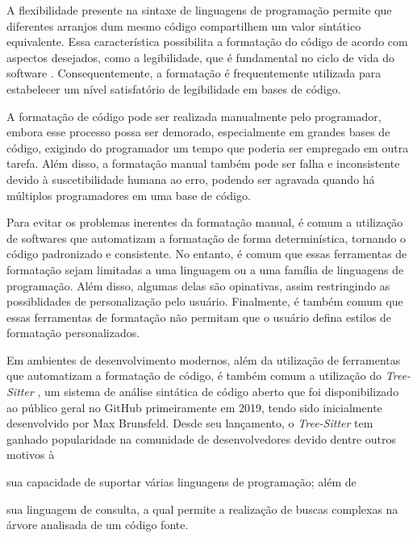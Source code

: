 \documentclass
  [11pt, a4paper, english, openright, sumario = tradicional, twoside, brazil]
  {abntex2}
\begin{document}
  A flexibilidade presente na sintaxe de linguagens de programação permite que
  diferentes arranjos dum mesmo código compartilhem um valor sintático
  equivalente. Essa característica possibilita a formatação do código de acordo
  com aspectos desejados, como a legibilidade, que é fundamental no ciclo de
  vida do software
  \cites[546]{buse-2009-learning}[1]{oliveira-2020-evaluating}.
  Consequentemente, a formatação é frequentemente utilizada para estabelecer um
  nível satisfatório de legibilidade em bases de código.

  A formatação de código pode ser realizada manualmente pelo programador,
  embora esse processo possa ser demorado, especialmente em grandes bases de
  código, exigindo do programador um tempo que poderia ser empregado em outra
  tarefa. Além disso, a formatação manual também pode ser falha e inconsistente
  devido à suscetibilidade humana ao erro, podendo ser agravada quando há
  múltiplos programadores em uma base de código.

  Para evitar os problemas inerentes da formatação manual, é comum a utilização
  de softwares que automatizam a formatação de forma determinística, tornando o
  código padronizado e consistente. No entanto, é comum que essas ferramentas
  de formatação sejam limitadas a uma linguagem ou a uma família de linguagens
  de programação. Além disso, algumas delas são opinativas, assim restringindo
  as possiblidades de personalização pelo usuário. Finalmente, é também comum
  que essas ferramentas de formatação não permitam que o usuário defina estilos
  de formatação personalizados.

  Em ambientes de desenvolvimento modernos, além da utilização de ferramentas
  que automatizam a formatação de código, é também comum a utilização do
  \textit{Tree-Sitter} \cite{tree-sitter-2018-tree}, um sistema de análise
  sintática de código aberto que foi disponibilizado ao público geral no GitHub
  primeiramente em 2019, tendo sido inicialmente desenvolvido por Max
  Brunsfeld. Desde seu lançamento, o \textit{Tree-Sitter} tem ganhado
  popularidade na comunidade de desenvolvedores devido dentre outros motivos à
  \begin{inparaenum}
    \item sua capacidade de suportar várias linguagens de programação; além de
    \item sua linguagem de consulta, a qual permite a realização de buscas
          complexas na árvore analisada de um código fonte.
  \end{inparaenum}
\end{document}
